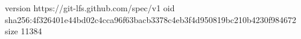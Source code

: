 version https://git-lfs.github.com/spec/v1
oid sha256:4f326401e44bd02c4cca96f63bacb3378c4eb3f4d950819bc210b4230f984672
size 11384
